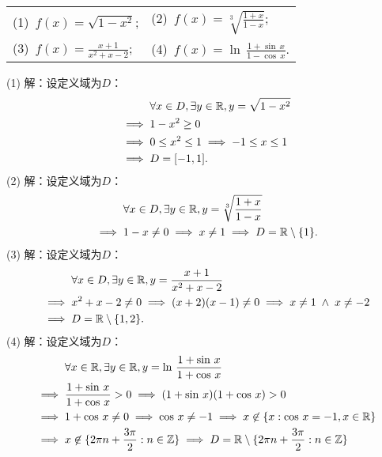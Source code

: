 \begin{table}[H]
    \centering
    \begin{tabularx}{\textwidth} {  >{\raggedright\arraybackslash}X >{\raggedright\arraybackslash}X  }
        (1)~$f(x)=\displaystyle\sqrt{1-x^2}$; & (2)~$f(x)=\displaystyle\sqrt[3]{\displaystyle\frac{1+x}{1-x}}$; \\ [1em]
        (3)~$f(x)=\displaystyle\frac{x+1}{x^2 + x -2}$; & (4)~$f(x) = \ln \, \displaystyle\frac{1+\sin \, x}{1-\cos \, x}$.
      \end{tabularx}
\end{table}
\noindent (1) 解：设定义域为$D$：
\begin{align}
    &\mathrel{\phantom{\implies}} \forall x \in D, \exists y \in \mathbb{R}, y = \displaystyle\sqrt{1-x^2} \\
    &\implies 1 - x^2 \geq 0 \\
    &\implies 0 \leq x^2 \leq 1 \implies -1 \leq x \leq 1 \\
    &\implies D = [-1, 1].
\end{align}
\noindent (2) 解：设定义域为$D$：
\begin{align}
    &\mathrel{\phantom{\implies}} \forall x \in D, \exists y \in \mathbb{R}, y = \displaystyle\sqrt[3]{\displaystyle\frac{1+x}{1-x}} \\
    &\implies 1 - x \neq 0 \implies x \neq 1 \implies D = \mathbb{R} \setminus \{ 1 \}.
\end{align}
\noindent (3) 解：设定义域为$D$：
\begin{align}
    &\mathrel{\phantom{\implies}} \forall x \in D, \exists y \in \mathbb{R}, y = \displaystyle\frac{x+1}{x^2 +x - 2} \\
    &\implies x^2 + x - 2 \neq 0 \implies (x+2)(x-1) \neq 0 \implies x \neq 1 \; \land \; x \neq -2 \\
    &\implies D = \mathbb{R} \setminus \{ 1, 2 \}.
\end{align}
\noindent (4) 解：设定义域为$D$：
\begin{align}
    &\mathrel{\phantom{\implies}} \forall x \in \mathbb{R}, \exists y \in \mathbb{R}, y = \ln \, \frac{1+\sin \, x}{1+ \cos \, x} \\
    &\implies \frac{1+\sin \, x}{1+\cos \, x} > 0 \implies (1+\sin \, x)(1+\cos \, x) > 0  \\
    &\implies 1 + \cos \, x \neq 0 \implies \cos \, x \neq -1 \implies x \not\in \{x : \cos \, x = -1, x \in \mathbb{R} \} \\
    &\implies x \not\in \{ 2\pi n + \frac{3\pi}{2} : n \in \mathbb{Z} \} \implies D = \mathbb{R} \setminus \{ 2 \pi n + \frac{3 \pi}{2} : n \in \mathbb{Z} \}
\end{align}

